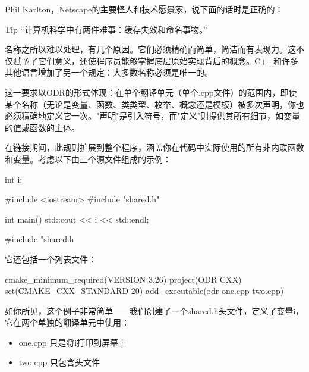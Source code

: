 
Phil Karlton，Netscape的主要怪人和技术愿景家，说下面的话时是正确的：

\begin{myTip}{Tip}
 “计算机科学中有两件难事：缓存失效和命名事物。”
\end{myTip}

名称之所以难以处理，有几个原因。它们必须精确而简单，简洁而有表现力。这不仅赋予了它们意义，还使程序员能够掌握底层原始实现背后的概念。C++和许多其他语言增加了另一个规定：大多数名称必须是唯一的。

这一要求以ODR的形式体现：在单个翻译单元（单个.cpp文件）的范围内，即使某个名称（无论是变量、函数、类类型、枚举、概念还是模板）被多次声明，你也必须精确地定义它一次。"声明"是引入符号，而"定义"则提供其所有细节，如变量的值或函数的主体。

在链接期间，此规则扩展到整个程序，涵盖你在代码中实际使用的所有非内联函数和变量。考虑以下由三个源文件组成的示例：


\begin{cpp}
int i;
\end{cpp}


\begin{cpp}
#include <iostream>
#include "shared.h"

int main() {
    std::cout << i << std::endl;
}
\end{cpp}


\begin{cpp}
#include "shared.h
\end{cpp}

它还包括一个列表文件：


\begin{cmake}
cmake_minimum_required(VERSION 3.26)
project(ODR CXX)
set(CMAKE_CXX_STANDARD 20)
add_executable(odr one.cpp two.cpp)
\end{cmake}

如你所见，这个例子非常简单——我们创建了一个shared.h头文件，定义了变量i，它在两个单独的翻译单元中使用：

\begin{itemize}
\item
one.cpp 只是将i打印到屏幕上

\item
two.cpp 只包含头文件
\end{itemize}

